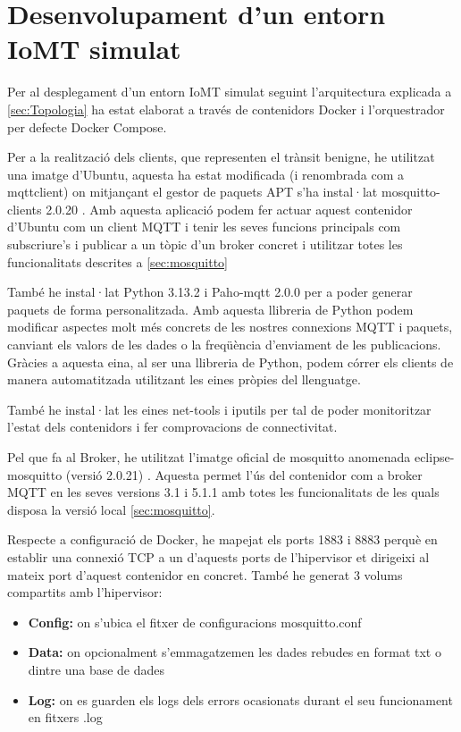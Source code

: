 \chapter{Desenvolupament d’un entorn IoMT simulat}
Per al desplegament d’un entorn IoMT simulat seguint l’arquitectura explicada a \ref{sec:Topologia} ha estat elaborat a través de contenidors Docker i l’orquestrador per defecte Docker Compose.

Per a la realització dels clients, que representen el trànsit benigne, he utilitzat una imatge d’Ubuntu, aquesta ha estat modificada (i renombrada com a mqttclient) on mitjançant el gestor de paquets APT  s'ha instal·lat mosquitto-clients 2.0.20 \cite{ubuntuimg}. Amb aquesta aplicació podem fer actuar aquest contenidor d'Ubuntu com un client MQTT i tenir les seves funcions principals com subscriure’s i publicar a un tòpic d’un broker concret i utilitzar totes les funcionalitats descrites a \ref{sec:mosquitto}

També he instal·lat Python 3.13.2 i Paho-mqtt 2.0.0 \cite{pahoexp} per a poder generar paquets de forma personalitzada. Amb aquesta llibreria de Python podem modificar aspectes molt més concrets de les nostres connexions MQTT i paquets, canviant els valors de les dades o la freqüència d’enviament de les publicacions. Gràcies a aquesta eina, al ser una llibreria de Python, podem córrer els clients de manera automatitzada utilitzant les eines pròpies del llenguatge.

També he instal·lat les eines net-tools i iputils per tal de poder monitoritzar l’estat dels contenidors i fer comprovacions de connectivitat.


Pel que fa al Broker, he utilitzat l’imatge oficial de mosquitto anomenada eclipse-mosquitto (versió 2.0.21) \cite{mosquittoimg}. Aquesta permet l’ús del contenidor com a broker MQTT en les seves versions 3.1 i 5.1.1 amb totes les funcionalitats de les quals disposa la versió local \ref{sec:mosquitto}.

Respecte a configuració de Docker, he mapejat els ports 1883 i 8883 perquè en establir una connexió TCP a un d’aquests ports de l'hipervisor et dirigeixi al mateix port d’aquest contenidor en concret. També he generat 3 volums compartits amb l'hipervisor:
\begin{itemize}
    \item \textbf{Config:} on s’ubica el fitxer de configuracions mosquitto.conf
    \item \textbf{Data:} on opcionalment s'emmagatzemen les dades rebudes en format txt o dintre una base de dades
    \item \textbf{Log:} on es guarden els logs dels errors ocasionats durant el seu funcionament en fitxers .log
\end{itemize} 

